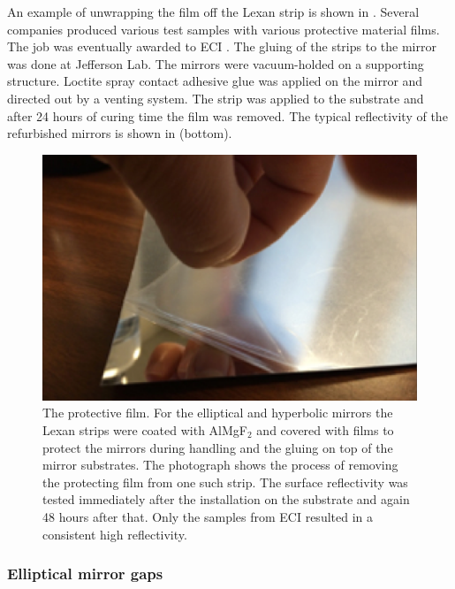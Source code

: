 An example of unwrapping the film off the Lexan strip is shown in . Several companies produced various test samples with
various protective material films. The job was eventually awarded to ECI \cite{ECI}.
The gluing of the strips to the mirror was done at Jefferson Lab. The mirrors were vacuum-holded on a supporting structure.
Loctite spray contact adhesive glue was applied on the mirror and directed out by a venting system.
The strip was applied to the substrate and after 24 hours of curing time the film was removed.
The typical reflectivity of the refurbished mirrors is shown in  (bottom).


\begin{figure}
\centering
	\includegraphics[width=0.98\columnwidth, height=0.7\columnwidth]{img/filmOnStrip.png}
	\caption{The protective film. For the elliptical and hyperbolic mirrors the Lexan strips were coated with AlMgF$_2$
			 and covered with films to protect the mirrors during handling and the gluing on top of the mirror substrates.
             The photograph shows the process of removing the protecting film from one such strip.
             The surface reflectivity was tested immediately after the installation on the substrate and again 48 hours after that.
             Only the samples from ECI \cite{ECI} resulted in a consistent high reflectivity. }
	\label{fig:filmOnStrip}
\end{figure}


\subsubsection{Elliptical mirror gaps}

